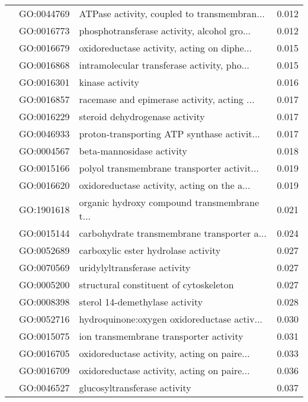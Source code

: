 \begin{longtable}{lllr}
   & GO:0044769 &  ATPase activity, coupled to transmembran... &         0.012 \\
   & GO:0016773 &  phosphotransferase activity, alcohol gro... &         0.012 \\
   & GO:0016679 &  oxidoreductase activity, acting on diphe... &         0.015 \\
   & GO:0016868 &  intramolecular transferase activity, pho... &         0.015 \\
   & GO:0016301 &                              kinase activity &         0.016 \\
   & GO:0016857 &  racemase and epimerase activity, acting ... &         0.017 \\
   & GO:0016229 &               steroid dehydrogenase activity &         0.017 \\
   & GO:0046933 &  proton-transporting ATP synthase activit... &         0.017 \\
   & GO:0004567 &                    beta-mannosidase activity &         0.018 \\
   & GO:0015166 &  polyol transmembrane transporter activit... &         0.019 \\
   & GO:0016620 &  oxidoreductase activity, acting on the a... &         0.019 \\
   & GO:1901618 &  organic hydroxy compound transmembrane t... &         0.021 \\
   & GO:0015144 &  carbohydrate transmembrane transporter a... &         0.024 \\
   & GO:0052689 &          carboxylic ester hydrolase activity &         0.027 \\
   & GO:0070569 &                 uridylyltransferase activity &         0.027 \\
   & GO:0005200 &       structural constituent of cytoskeleton &         0.027 \\
   & GO:0008398 &               sterol 14-demethylase activity &         0.028 \\
   & GO:0052716 &  hydroquinone:oxygen oxidoreductase activ... &         0.030 \\
   & GO:0015075 &       ion transmembrane transporter activity &         0.031 \\
   & GO:0016705 &  oxidoreductase activity, acting on paire... &         0.033 \\
   & GO:0016709 &  oxidoreductase activity, acting on paire... &         0.036 \\
   & GO:0046527 &                 glucosyltransferase activity &         0.037 \\

\end{longtable}
